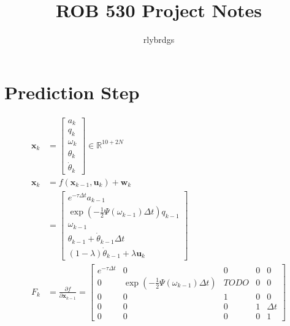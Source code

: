 \documentclass[11pt]{article}
\title{ROB 530 Project Notes}
\author{rlybrdgs }
\newcommand{\pd}[2]{\frac{\partial #1}{\partial #2}} %
\begin{document}
\maketitle
\section{Prediction Step}
\begin{align*}
    \mathbf{x}_k &= \begin{bmatrix}
        a_k \\ q_k \\ \omega_k \\ \theta_k \\ \dot{\theta}_k
    \end{bmatrix} \in \mathbb{R}^{10+2N} \\
    \mathbf{x}_k &= f(\mathbf{x}_{k-1}, \mathbf{u}_k) + \mathbf{w}_k \\
    &= \begin{bmatrix}
        e^{-\tau \Delta t} a_{k-1} \\
        \exp\left(-\frac{1}{2} \Psi(\omega_{k-1}) \Delta t\right) q_{k-1} \\
        \omega_{k-1} \\
        \theta_{k-1} + \dot{\theta}_{k-1} \Delta t \\
        (1 - \lambda) \dot{\theta}_{k-1} + \lambda \mathbf{u}_k
    \end{bmatrix} \\
    F_k &= \pd{f}{\mathbf{x}_{k-1}} = \begin{bmatrix}
        e^{-\tau \Delta t} & 0 & 0 & 0 & 0 \\
        0 & \exp\left(-\frac{1}{2} \Psi(\omega_{k-1}) \Delta t\right) & TODO & 0 & 0 \\
        0 & 0 & 1 & 0 & 0 \\
        0 & 0 & 0 & 1 & \Delta t \\
        0 & 0 & 0 & 0 & 1
    \end{bmatrix} \\
\end{align*}
\end{document}
